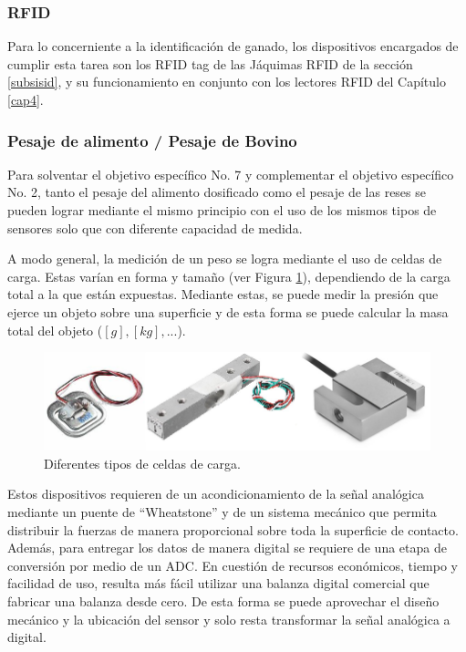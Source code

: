 \subsubsection{RFID}

Para lo concerniente a la identificación de ganado, los dispositivos encargados de cumplir esta tarea son los RFID tag de las Jáquimas RFID de la sección \ref{subsisid}, y su funcionamiento en conjunto con los lectores RFID del Capítulo \ref{cap4}.

\subsubsection{Pesaje de alimento / Pesaje de Bovino}

Para solventar el objetivo específico No. 7 y complementar el objetivo específico No. 2, tanto el pesaje del alimento dosificado como el pesaje de las reses se pueden lograr mediante el mismo principio con el uso de los mismos tipos de sensores solo que con diferente capacidad de medida.

A modo general, la medición de un peso se logra mediante el uso de celdas de carga. Estas varían en forma y tamaño (ver Figura \ref{celdaspng}), dependiendo de la carga total a la que están expuestas. Mediante estas, se puede medir la presión que ejerce un objeto sobre una superficie y de esta forma se puede calcular la masa total del objeto ($[g], [kg], ...$).

    \begin{figure}[H]
	    \begin{center}
	    	\includegraphics[scale=0.80]{img/celdas.png}
        \end{center}
	    \caption{Diferentes tipos de celdas de carga. \label{celdaspng}}
    \end{figure}

    Estos dispositivos requieren de un acondicionamiento de la señal analógica mediante un puente de ``Wheatstone'' y de un sistema mecánico que permita distribuir la fuerzas de manera proporcional sobre toda la superficie de contacto. Además, para entregar los datos de manera digital se requiere de una etapa de conversión por medio de un ADC.
    En cuestión de recursos económicos, tiempo y facilidad de uso, resulta más fácil utilizar una balanza digital comercial que fabricar una balanza desde cero. De esta forma se puede aprovechar el diseño mecánico y la ubicación del sensor y solo resta transformar la señal analógica a digital.
    
